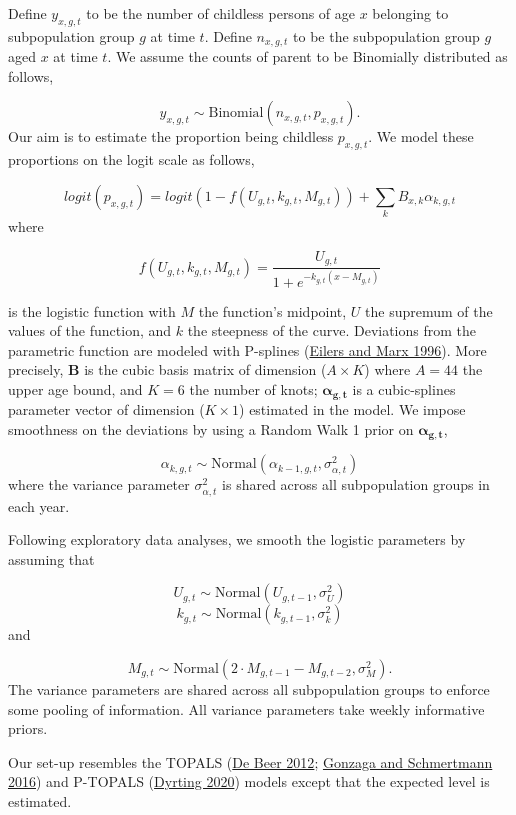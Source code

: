 \documentclass[
  11pt,
  letterpaper,
]{article}
\begin{document}
Define \(y_{x, g, t}\) to be the number of childless persons of age \(x\) belonging to subpopulation group \(g\) at time \(t\). Define \(n_{x, g, t}\) to be the subpopulation group \(g\) aged \(x\) at time \(t\). We assume the counts of parent to be Binomially distributed as follows,

\[y_{x, g, t} \sim \text{Binomial}(n_{x, g, t}, p_{x, g, t}).\]
Our aim is to estimate the proportion being childless \(p_{x, g, t}\). We model these proportions on the logit scale as follows,

\[logit(p_{x, g, t}) = logit(1 - f(U_{g, t}, k_{g, t}, M_{g, t})) + \sum_k B_{x,k} \alpha_{k,g,t}\]
where

\[f(U_{g, t}, k_{g, t}, M_{g, t}) =  \frac{U_{g,t}}{1+e^{-k_{g,t}(x-M_{g,t})}}\]

is the logistic function with \(M\) the function's midpoint, \(U\) the supremum of the values of the function, and \(k\) the steepness of the curve. Deviations from the parametric function are modeled with P-splines (\protect\hyperlink{ref-eilers1996flexible}{Eilers and Marx 1996}). More precisely, \(\boldsymbol{B}\) is the cubic basis matrix of dimension (\(A \times K\)) where \(A=44\) the upper age bound, and \(K=6\) the number of knots; \(\boldsymbol{\alpha_{g,t}}\) is a cubic-splines parameter vector of dimension (\(K \times 1\)) estimated in the model. We impose smoothness on the deviations by using a Random Walk 1 prior on \(\boldsymbol{\alpha_{g,t}}\),

\[\alpha_{k,g,t} \sim \text{Normal}(\alpha_{k-1,g,t}, \sigma_{\alpha, t}^2)\]
where the variance parameter \(\sigma_{\alpha,t}^2\) is shared across all subpopulation groups in each year.

Following exploratory data analyses, we smooth the logistic parameters by assuming that

\[U_{g,t} \sim \text{Normal}(U_{g,t-1}, \sigma_U^2)\]
\[k_{g,t} \sim \text{Normal}(k_{g,t-1}, \sigma_k^2)\]
and

\[M_{g,t} \sim \text{Normal}(2\cdot M_{g,t-1} - M_{g,t-2}, \sigma_M^2).\]
The variance parameters are shared across all subpopulation groups to enforce some pooling of information. All variance parameters take weekly informative priors.

Our set-up resembles the TOPALS (\protect\hyperlink{ref-de2012smoothing}{De Beer 2012}; \protect\hyperlink{ref-gonzaga2016estimating}{Gonzaga and Schmertmann 2016}) and P-TOPALS (\protect\hyperlink{ref-dyrting2020smoothing}{Dyrting 2020}) models except that the expected level is estimated.
\end{document}
